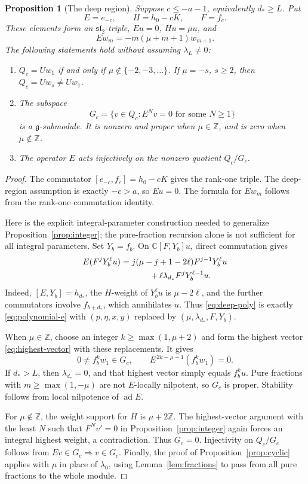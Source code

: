 \documentclass[11pt,a4paper]{article}
\newcommand{\C}{\mathbb C}
\newcommand{\Z}{\mathbb Z}
\newcommand{\g}{\mathfrak g}
\newcommand{\slc}{\mathfrak{sl}_2}
\newcommand{\ad}{\operatorname{ad}}
\theoremstyle{plainupright}
\newtheorem{proposition}{Proposition}[section]
\begin{document}
\begin{proposition}[The deep region]\label{prop:deep}
Suppose \(c\le-a-1\), equivalently \(d_*\ge L\). Put
\[
E=e_{-c},\qquad H=h_0-cK,\qquad F=f_c.
\]
These elements form an \(\slc\)-triple, \(Eu=0\), \(Hu=\mu u\), and
\[
Ew_m=-m(\mu+m+1)w_{m+1}.
\]
The following statements hold without assuming \(\lambda_L\ne0\):
\begin{enumerate}[label=(\roman*)]
\item \(Q_c=Uw_1\) if and only if \(\mu\notin\{-2,-3,\ldots\}\).
If \(\mu=-s\), \(s\ge2\), then \(Q_c=Uw_s\ne Uw_1\).
\item The subspace
\[
G_c=\{v\in Q_c:E^Nv=0\text{ for some }N\ge1\}
\]
is a \(\g\)-submodule. It is nonzero and proper when \(\mu\in\Z\),
and is zero when \(\mu\notin\Z\).
\item The operator \(E\) acts injectively on the nonzero quotient
\(Q_c/G_c\).
\end{enumerate}
\end{proposition}
\begin{proof}
The commutator \([e_{-c},f_c]=h_0-cK\) gives the rank-one triple.
The deep-region assumption is exactly \(-c>a\), so \(Eu=0\).
The formula for \(Ew_m\) follows from the rank-one commutation identity.

Here is the explicit integral-parameter construction needed to generalize
Proposition~\ref{prop:integer}; the pure-fraction recursion alone is not
sufficient for all integral parameters.
Set \(Y_b=f_b\). On \(\C[F,Y_b]u\), direct commutation gives
\begin{align}
E(F^jY_b^\ell u)
&=j(\mu-j+1-2\ell)F^{j-1}Y_b^\ell u\notag\\
&\hspace{12mm}+\ell\lambda_{d_*}F^jY_b^{\ell-1}u.\label{eq:deep-poly}
\end{align}
Indeed, \([E,Y_b]=h_{d_*}\), the \(H\)-weight of \(Y_b^\ell u\)
is \(\mu-2\ell\), and the further commutators involve \(f_{b+d_*}\),
which annihilates \(u\). Thus \eqref{eq:deep-poly} is exactly
\eqref{eq:polynomial-e} with
\((p,\eta,x,y)\) replaced by \((\mu,\lambda_{d_*},F,Y_b)\).

When \(\mu\in\Z\), choose an integer \(k\ge\max(1,\mu+2)\) and form
the highest vector \eqref{eq:highest-vector} with these replacements.
It gives
\[
0\ne f_b^kw_1\in G_c,\qquad
E^{\,2k-\mu-1}(f_b^kw_1)=0.
\]
If \(d_*>L\), then \(\lambda_{d_*}=0\), and that highest vector
simply equals \(f_b^ku\). Pure fractions with
\(m\ge\max(1,-\mu)\) are not \(E\)-locally nilpotent, so \(G_c\) is proper.
Stability follows from local nilpotence of \(\ad E\).

For \(\mu\notin\Z\), the weight support for \(H\) is \(\mu+2\Z\).
The highest-vector argument with the least \(N\) such that \(F^Nv'=0\)
in Proposition~\ref{prop:integer} again forces an integral highest weight,
a contradiction. Thus \(G_c=0\). Injectivity on \(Q_c/G_c\) follows from
\(Ev\in G_c\Rightarrow v\in G_c\).
Finally, the proof of Proposition~\ref{prop:cyclic} applies with \(\mu\)
in place of \(\lambda_0\), using Lemma~\ref{lem:fractions} to pass
from all pure fractions to the whole module.
\end{proof}
\end{document}
